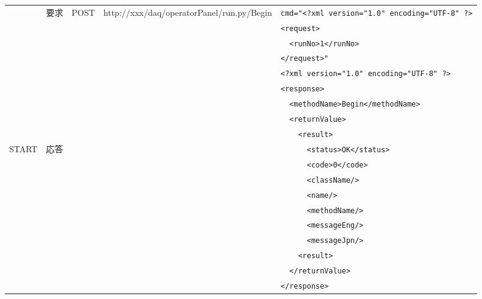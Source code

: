 \documentclass[a4j,10pt,dvips,onecolumn,oneside,final]{jarticle}%
\begin{document}
\begin{table}[htbp]
\begin{center}
{\begin{tabular}{|c|c|c|l|l|}
                  & 要求      & POST & http://xxx/daq/operatorPanel/run.py/Begin  & \verb|cmd="<?xml version="1.0" encoding="UTF-8" ?>|\\
                  &           &      &                                            & \verb|<request>|\\ 
                  &           &      &                                            & \verb|  <runNo>1</runNo>|\\
                  &           &      &                                            & \verb|</request>"|\\ \cline{2-5}
                  &           &      &                                            & \verb|<?xml version="1.0" encoding="UTF-8" ?>|\\ 
                  &           &      &                                            & \verb|<response>|\\ 
                  &           &      &                                            & \verb|  <methodName>Begin</methodName>|\\ 
                  &           &      &                                            & \verb|  <returnValue>|\\ 
                  &           &      &                                            & \verb|    <result>|\\ 
      START       & 応答      &      &                                            & \verb|      <status>OK</status>|\\ 
                  &           &      &                                            & \verb|      <code>0</code>|\\ 
                  &           &      &                                            & \verb|      <className/>|\\ 
                  &           &      &                                            & \verb|      <name/>|\\ 
                  &           &      &                                            & \verb|      <methodName/>|\\ 
                  &           &      &                                            & \verb|      <messageEng/>|\\ 
                  &           &      &                                            & \verb|      <messageJpn/>|\\ 
                  &           &      &                                            & \verb|    <result>|\\
                  &           &      &                                            & \verb|  </returnValue>|\\ 
                  &           &      &                                            & \verb|</response>|\\ \hline


\end{tabular}}
\end{center}
\end{table}
\end{document}

